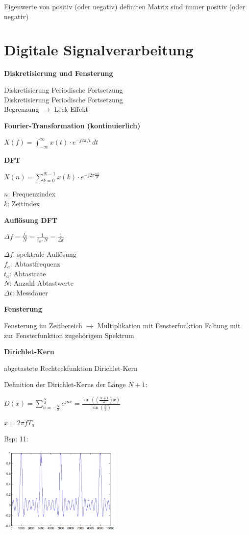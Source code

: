 Eigenwerte von positiv (oder negativ) definiten Matrix sind immer positiv (oder negativ)


\section{Digitale Signalverarbeitung}

\textbf{Diskretisierung und Fensterung}

Diskretisierung \laplace \; Periodische Fortsetzung\\
Diskretisierung \Laplace \; Periodische Fortsetzung\\
Begrenzung $\rightarrow$ Leck-Effekt

\textbf{Fourier-Transformation (kontinuierlich)}

$\displaystyle{
    X(f) = \int_{-\infty}^{\infty} x(t) \cdot e^{-j2\pi ft} \, dt
}$

\textbf{DFT}

$\displaystyle{
    X(n) = \sum_{k=0}^{N-1} x(k) \cdot e^{-j2\pi \frac{nk}{N}}
}$

$n$: Frequenzindex\\
$k$: Zeitindex

\textbf{Auflösung DFT}

$\displaystyle{
    \Delta f = \frac{f_a}{N} = \frac{1}{t_a \cdot N} = \frac{1}{\Delta t}
}$

$\Delta f$: spektrale Auflösung\\
$f_a$: Abtastfrequenz\\
$t_a$: Abtastrate\\
$N$: Anzahl Abtastwerte\\
$\Delta t$: Messdauer

\textbf{Fensterung}

Fensterung im Zeitbereich $\rightarrow$ Multiplikation mit Fensterfunktion \laplace \; Faltung mit zur Fensterfunktion zugehörigem Spektrum

\textbf{Dirichlet-Kern}

abgetastete Rechteckfunktion \laplace \; Dirichlet-Kern

Definition der Dirichlet-Kerns der Länge $N+1$:

$\displaystyle{
    D(x) = \sum_{n=-\frac{N}{2}}^{\frac{N}{2}} e^{jnx} =
    \frac{\sin\left( \left( \frac{N + 1}{2} \right) x \right)}{\sin\left( \frac{x}{2} \right)}
}$

$x = 2\pi fT_a$

Bsp: 11:

\includegraphics[width=6cm]{img/dirichlet-kern.png}

